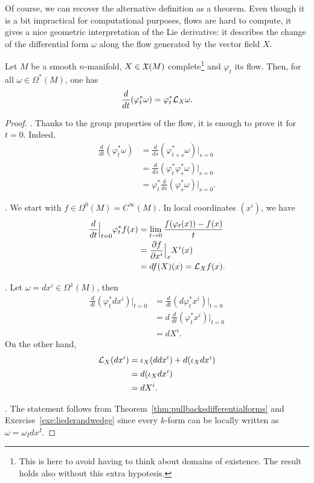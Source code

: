 Of course, we can recover the alternative definition as a theorem.
Even though it is a bit impractical for computational purposes, flows are hard to compute, it gives a nice geometric interpretation of the Lie derivative: it describes the change of the differential form $\omega$ along the flow generated by the vector field $X$.

\begin{theorem}\label{thm:LieDerivativeFlow}
	Let $M$ be a smooth $n$-manifold, $X\in\mathfrak{X}(M)$ complete\footnote{This is here to avoid having to think about domains of existence. The result holds also without this extra hypotesis.} and $\varphi_t$ its flow.
	Then, for all $\omega\in \Omega^*(M)$, one has
	\begin{equation}
		\frac{d}{dt}(\varphi_t^* \omega) = \varphi_t^*\mathcal{L}_X\omega.
	\end{equation}
\end{theorem}
\begin{proof}
	.
	Thanks to the group properties of the flow, it is enough to prove it for $t=0$.
	Indeed,
	\begin{align}
		\frac{d}{dt}(\varphi_t^* \omega)
		 & = \frac{d}{ds}(\varphi_{t+s}^* \omega)\Big|_{s=0}         \\
		 & = \frac{d}{ds}(\varphi_t^*\varphi_s^*\omega)\Big|_{s=0}   \\
		 & = \varphi^*_t \frac{d}{ds}(\varphi_s^*\omega)\Big|_{s=0}.
	\end{align}

	.
	We start with $f\in\Omega^0(M) = C^\infty(M)$.
	In local coordinates $(x^i)$, we have
	\begin{align}
		\frac{d}{dt}\Big|_{t=0}\varphi_t^* f(x)
		 & = \lim_{t\to0} \frac{f(\varphi_t(x)) - f(x)}{t} \\
		 & = \frac{\partial f}{\partial x^i}\Big|_x X^i(x) \\
		 & = df(X)(x) = \mathcal{L}_X f(x).
	\end{align}

	. Let $\omega = dx^i \in \Omega^1(M)$, then
	\begin{align}
		\frac{d}{dt}(\varphi_t^* dx^i)\Big|_{t=0}
		 & = \frac{d}{dt}(d\varphi_t^* x^i)\Big|_{t=0}    \\
		 & = d\, \frac{d}{dt}(\varphi_t^* x^i)\Big|_{t=0} \\
		 & = dX^i.
	\end{align}
	On the other hand,
	\begin{align}
		\mathcal{L}_X(dx^i)
		 & = \iota_X(ddx^i) + d(\iota_X dx^i) \\
		 & = d(\iota_X dx^i)                  \\
		 & = dX^i.
	\end{align}

	. The statement follows from Theorem~\ref{thm:pullbacksdifferentialforms} and Exercise~\ref{exe:liederandwedge} since every $k$-form can be locally written as $\omega = \omega_I dx^I$.
\end{proof}

